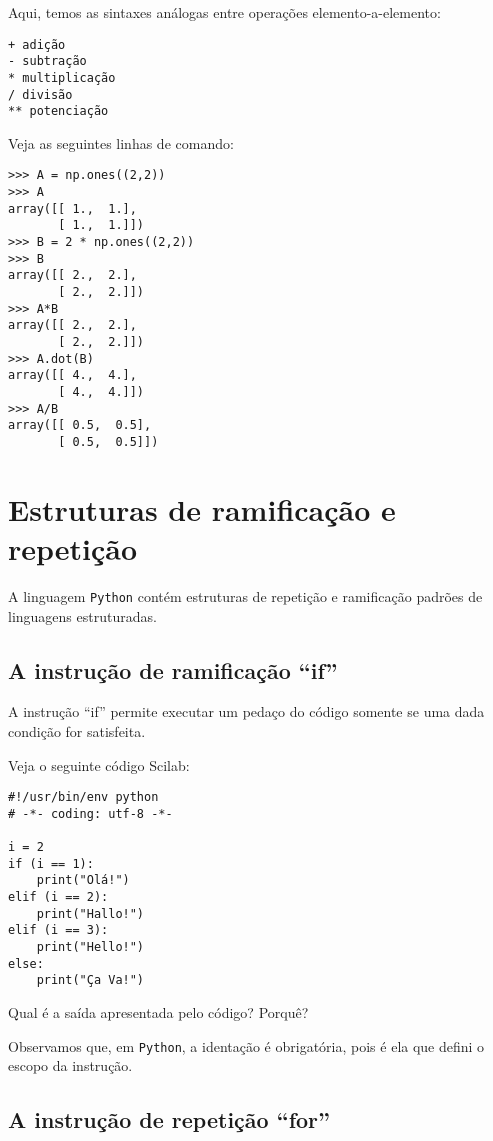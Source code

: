 Aqui, temos as sintaxes análogas entre operações elemento-a-elemento:
\begin{verbatim}
+ adição       
- subtração    
* multiplicação 
/ divisão
** potenciação
\end{verbatim}

\begin{ex}
  Veja as seguintes linhas de comando:
\begin{verbatim}
>>> A = np.ones((2,2))
>>> A
array([[ 1.,  1.],
       [ 1.,  1.]])
>>> B = 2 * np.ones((2,2))
>>> B
array([[ 2.,  2.],
       [ 2.,  2.]])
>>> A*B
array([[ 2.,  2.],
       [ 2.,  2.]])
>>> A.dot(B)
array([[ 4.,  4.],
       [ 4.,  4.]])
>>> A/B
array([[ 0.5,  0.5],
       [ 0.5,  0.5]])
\end{verbatim}
\end{ex}

\section{Estruturas de ramificação e repetição}

A linguagem \verb+Python+ contém estruturas de repetição e ramificação padrões de linguagens estruturadas.

\subsection{A instrução de ramificação ``if''}

A instrução ``if'' permite executar um pedaço do código somente se uma dada condição for satisfeita.

\begin{ex}
  Veja o seguinte código Scilab:
\begin{verbatim}
#!/usr/bin/env python
# -*- coding: utf-8 -*-

i = 2
if (i == 1):
    print("Olá!")
elif (i == 2):
    print("Hallo!")
elif (i == 3):
    print("Hello!")
else:
    print("Ça Va!")
\end{verbatim}
Qual é a saída apresentada pelo código? Porquê?
\end{ex}

Observamos que, em \verb+Python+, a identação é obrigatória, pois é ela que defini o escopo da instrução.

\subsection{A instrução de repetição ``for''}


